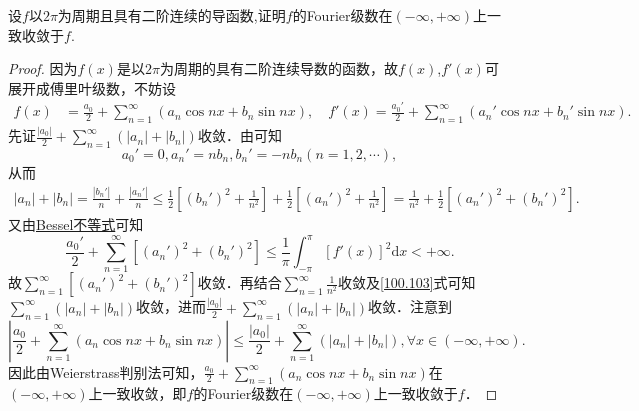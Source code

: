 \documentclass[../../main.tex]{subfiles}
\begin{document}
\begin{example}
设$f$以$2\pi$为周期且具有二阶连续的导函数,证明$f$的Fourier级数在$(-\infty,+\infty)$上一致收敛于$f$.
\end{example}
\begin{proof}
因为$f(x)$是以$2\pi$为周期的具有二阶连续导数的函数，故$f(x)$,$f'(x)$可展开成傅里叶级数，不妨设
\begin{align*}
f(x) &=\frac{a_0}{2}+\sum_{n=1}^{\infty}(a_n\cos nx+b_n\sin nx),\quad f'(x)=\frac{a_{0}'}{2}+\sum_{n=1}^{\infty}(a_{n}'\cos nx+b_{n}'\sin nx).
\end{align*}
先证$\frac{|a_0|}{2}+\sum_{n=1}^{\infty}(|a_n|+|b_n|)$收敛．由可知
$$a_{0}'=0,a_{n}'=nb_n,b_{n}'=-nb_n(n=1,2,\cdots),$$
从而
\begin{align}
|a_n|+|b_n|=\frac{|b_{n}'|}{n}+\frac{|a_{n}'|}{n}\leqslant \frac{1}{2}\left[(b_{n}')^2+\frac{1}{n^2}\right]+\frac{1}{2}\left[(a_{n}')^2+\frac{1}{n^2}\right]
=\frac{1}{n^2}+\frac{1}{2}\left[(a_{n}')^2+(b_{n}')^2\right].\label{100.103}
\end{align}
又由\hyperref[theorem:Bessel不等式]{Bessel不等式}可知
$$\frac{a_{0}'}{2}+\sum_{n=1}^{\infty}\left[(a_{n}')^2+(b_{n}')^2\right]\leqslant \frac{1}{\pi}\int_{-\pi}^{\pi}[f'(x)]^2\mathrm{d}x<+\infty.$$
故$\sum_{n=1}^{\infty}\left[(a_{n}')^2+(b_{n}')^2\right]$收敛．再结合$\sum_{n=1}^{\infty}\frac{1}{n^2}$收敛及\eqref{100.103}式可知$\sum_{n=1}^{\infty}(|a_n|+|b_n|)$收敛，进而$\frac{|a_0|}{2}+\sum_{n=1}^{\infty}(|a_n|+|b_n|)$收敛．注意到
$$\left|\frac{a_0}{2}+\sum_{n=1}^{\infty}(a_n\cos nx+b_n\sin nx)\right|\leqslant \frac{|a_0|}{2}+\sum_{n=1}^{\infty}(|a_n|+|b_n|),\forall x\in(-\infty,+\infty).$$
因此由Weierstrass判别法可知，$\frac{a_0}{2}+\sum_{n=1}^{\infty}(a_n\cos nx+b_n\sin nx)$在$(-\infty,+\infty)$上一致收敛，即$f$的Fourier级数在$(-\infty,+\infty)$上一致收敛于$f$．
\end{proof}
\end{document}
